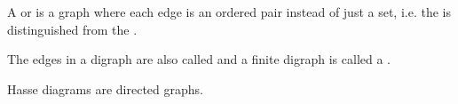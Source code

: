 \begin{definition}
A  or  is a graph where each edge is an ordered pair instead of just a set, i.e. the  is distinguished from the .

The edges in a digraph are also called  and a finite digraph is called a .
\end{definition}
\begin{example}
Hasse diagrams are directed graphs.
\end{example}